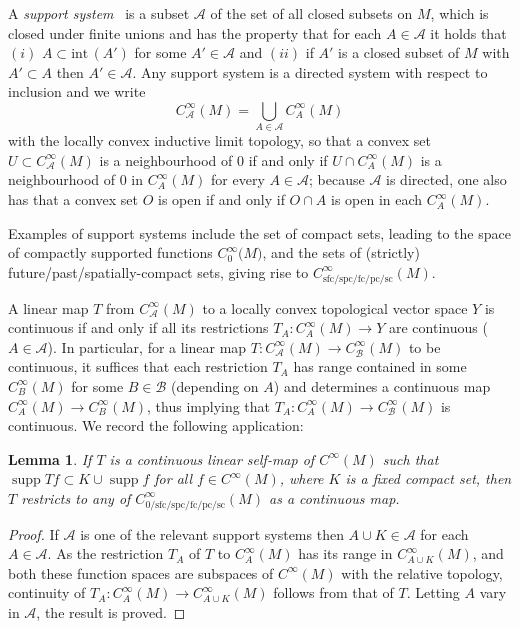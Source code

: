 \documentclass[pdftex]{sigma}
\numberwithin{equation}{section}
\newtheorem{Lemma}[Theorem]{Lemma}
\newcommand{\CoinX}[1]{C_0^\infty\big({#1}\big)}
\newcommand{\fc}{\mathrm{fc}}
\newcommand{\pc}{\mathrm{pc}}
\newcommand{\sfc}{\mathrm{sfc}}
\newcommand{\spc}{\mathrm{spc}}
\DeclareMathOperator{\supp}{supp}
\begin{document}
 A \emph{support system}~\cite{Baer:2015} is a subset $\mathscr A$ of the set of all closed subsets on $M$, which is closed under finite unions and has the property that for each $A\in \mathscr A$ it holds that $(i)$
 $A\subset \textrm{int}\,(A')$ for some $A'\in\mathscr A$ and $(ii)$ if $A'$ is a closed subset of $M$ with $A'\subset A$ then $A'\in\mathscr A$. Any support system is a directed system with respect to inclusion and we write
 \begin{equation*}
 	C^\infty_{\mathscr{A}}(M)= \bigcup_{A\in\mathscr{A}} C^\infty_A(M)
 \end{equation*}
 with the locally convex inductive limit topology,
 so that a convex set $U\subset C^\infty_{\mathscr{A}}(M)$ is a neighbourhood of $0$
 if and only if $U\cap C^\infty_A(M)$ is a neighbourhood of $0$ in $C^\infty_A(M)$ for every $A\in\mathscr{A}$; because $\mathscr{A}$ is directed, one also has that
 a convex set $O$ is open if and only if $O\cap A$ is open in each $C^\infty_A(M)$.

 Examples of support systems include the set of compact sets, leading to the space of compactly supported functions $\CoinX{M}$, and the sets of (strictly) future/past/spatially-compact sets, giving rise to $C^\infty_{\sfc/\spc/\fc/\pc/\mathrm{sc}}(M)$.

 A linear map $T$ from $C^\infty_{\mathscr{A}}(M)$ to a locally convex topological vector space $Y$ is continuous if and only if all its restrictions $T_A\colon C^\infty_A(M)\to Y$ are continuous ($A\in\mathscr{A}$). In particular, for a linear map $T\colon C^\infty_{\mathscr{A}}(M)\to C^\infty_{\mathscr{B}}(M)$ to be continuous, it suffices that each restriction $T_A$ has range contained in some $C^\infty_B(M)$ for some $B\in\mathscr{B}$ (depending on $A$) and determines a continuous map $C^\infty_A(M)\to C^\infty_B(M)$, thus implying that $T_A\colon C^\infty_A(M)\to C^\infty_{\mathscr{B}}(M)$ is continuous. We record the following application:
 \begin{Lemma}%
 	If $T$ is a continuous linear self-map of $C^\infty(M)$ such that $\supp Tf\subset K\cup \supp f$ for all $f\in C^\infty(M)$, where $K$ is a fixed compact set, then $T$ restricts to any of $C^\infty_{0/\sfc/\spc/\fc/\pc/\mathrm{sc}}(M)$ as a continuous map.
 \end{Lemma}
 \begin{proof}
 	If $\mathscr{A}$ is one of the relevant support systems then $A\cup K\in\mathscr{A}$ for each $A\in\mathscr{A}$. As the restriction $T_A$ of $T$ to $C^\infty_A(M)$ has its range in $C^\infty_{A\cup K}(M)$, and both these function spaces are subspaces of $C^\infty(M)$ with the relative topology, continuity of $T_A\colon C^\infty_A(M)\to C^\infty_{A\cup K}(M)$ follows from that of $T$. Letting $A$ vary in $\mathscr{A}$, the result is proved.
 \end{proof}
\end{document}
